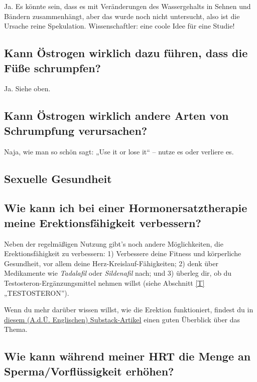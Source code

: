 \documentclass{article}
\begin{document}
{{{Ja. Es könnte sein, dass es mit Veränderungen des Wassergehalts in Sehnen und Bändern zusammenhängt, aber das wurde noch nicht untersucht, also ist die Ursache reine Spekulation. Wissenschaftler: eine coole Idee für eine Studie!

\subsection{Kann Östrogen wirklich dazu führen, dass die Füße schrumpfen?}

Ja. Siehe oben.

\subsection{Kann Östrogen wirklich andere Arten von Schrumpfung verursachen?}

Naja, wie man so schön sagt: „Use it or lose it“ – nutze es oder verliere es.

\subsection*{Sexuelle Gesundheit}

\subsection{Wie kann ich bei einer Hormonersatztherapie meine Erektionsfähigkeit verbessern?}\label{11-20}

Neben der regelmäßigen Nutzung gibt's noch andere Möglichkeiten, die Erektionsfähigkeit zu verbessern: 1) Verbessere deine Fitness und körperliche Gesundheit, vor allem deine Herz-Kreislauf-Fähigkeiten; 2) denk über Medikamente wie \textit{Tadalafil} oder \textit{Sildenafil} nach; und 3) überleg dir, ob du Testosteron-Ergänzungsmittel nehmen willst (siehe Abschnitt \ref{T} „TESTOSTERON”).

Wenn du mehr darüber wissen willst, wie die Erektion funktioniert, findest du in \href{https://stainedglasswoman.substack.com/p/how-to-maintain-your-penis-function}{diesem (A.d.Ü. Englischen) Substack-Artikel} einen guten Überblick über das Thema.

\subsection{Wie kann während meiner HRT die Menge an Sperma/Vorflüssigkeit erhöhen?}

}}}
\end{document}
